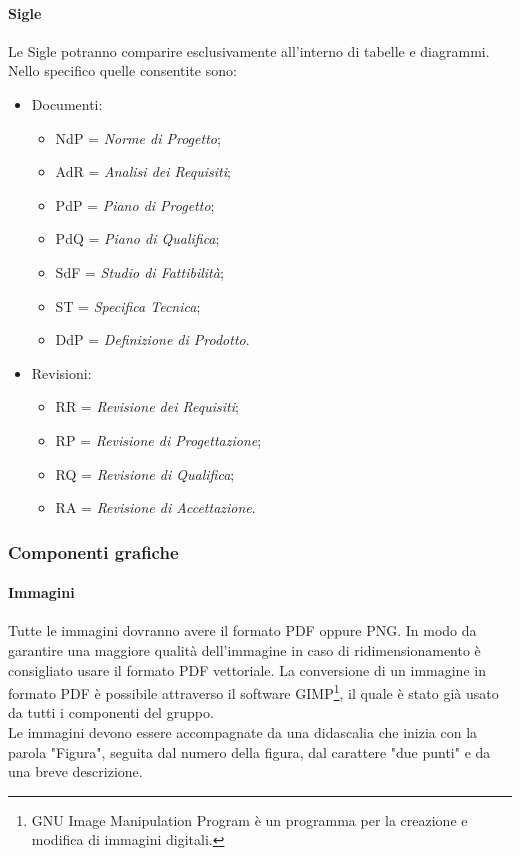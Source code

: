 \paragraph{Sigle}
Le Sigle potranno comparire esclusivamente all'interno di tabelle e diagrammi. Nello specifico quelle consentite sono: 
\begin{itemize}
	\item Documenti:
	\begin{itemize}
		\item NdP = \textit{Norme di Progetto};
		\item AdR = \textit{Analisi dei Requisiti};
		\item PdP = \textit{Piano di Progetto};
		\item PdQ = \textit{Piano di Qualifica};
		\item SdF = \textit{Studio di Fattibilità};
		\item ST = \textit{Specifica Tecnica};
		\item DdP = \textit{Definizione di Prodotto}.
	\end{itemize}
	\item Revisioni:
	\begin{itemize}
		\item RR = \textit{Revisione dei Requisiti};
		\item RP = \textit{Revisione di Progettazione};
		\item RQ = \textit{Revisione di Qualifica};
		\item RA = \textit{Revisione di Accettazione}.
	\end{itemize}
\end{itemize}

\subsubsection{Componenti grafiche}
\paragraph{Immagini}
Tutte le immagini dovranno avere il formato PDF oppure \gls{PNG}. In modo da garantire una maggiore qualità dell'immagine in caso di ridimensionamento è consigliato usare il formato PDF vettoriale. La conversione di un immagine in formato PDF è possibile attraverso il software GIMP\footnote{GNU Image Manipulation Program è un programma per la creazione e modifica di immagini digitali.}, il quale è stato già usato da tutti  i componenti del gruppo. \\ Le immagini devono essere accompagnate da una didascalia che inizia con la parola "Figura", seguita dal numero della figura, dal carattere "due punti" e da una breve descrizione.
